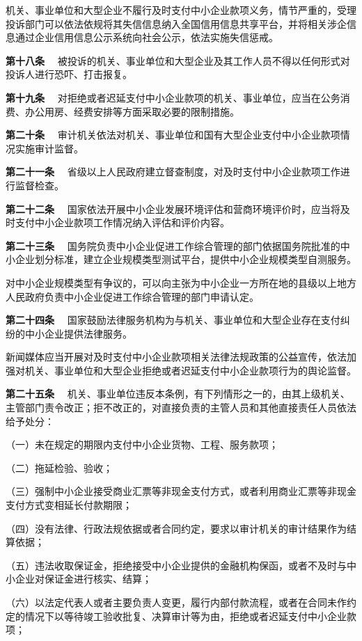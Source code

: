 机关、事业单位和大型企业不履行及时支付中小企业款项义务，情节严重的，受理投诉部门可以依法依规将其失信信息纳入全国信用信息共享平台，并将相关涉企信息通过企业信用信息公示系统向社会公示，依法实施失信惩戒。

{ \bf 第十八条 }　被投诉的机关、事业单位和大型企业及其工作人员不得以任何形式对投诉人进行恐吓、打击报复。

{ \bf 第十九条 }　对拒绝或者迟延支付中小企业款项的机关、事业单位，应当在公务消费、办公用房、经费安排等方面采取必要的限制措施。

{ \bf 第二十条 }　审计机关依法对机关、事业单位和国有大型企业支付中小企业款项情况实施审计监督。

{ \bf 第二十一条 }　省级以上人民政府建立督查制度，对及时支付中小企业款项工作进行监督检查。

{ \bf 第二十二条 }　国家依法开展中小企业发展环境评估和营商环境评价时，应当将及时支付中小企业款项工作情况纳入评估和评价内容。

{ \bf 第二十三条 }　国务院负责中小企业促进工作综合管理的部门依据国务院批准的中小企业划分标准，建立企业规模类型测试平台，提供中小企业规模类型自测服务。

对中小企业规模类型有争议的，可以向主张为中小企业一方所在地的县级以上地方人民政府负责中小企业促进工作综合管理的部门申请认定。

{ \bf 第二十四条 }　国家鼓励法律服务机构为与机关、事业单位和大型企业存在支付纠纷的中小企业提供法律服务。

新闻媒体应当开展对及时支付中小企业款项相关法律法规政策的公益宣传，依法加强对机关、事业单位和大型企业拒绝或者迟延支付中小企业款项行为的舆论监督。

{ \bf 第二十五条 }　机关、事业单位违反本条例，有下列情形之一的，由其上级机关、主管部门责令改正；拒不改正的，对直接负责的主管人员和其他直接责任人员依法给予处分：

（一）未在规定的期限内支付中小企业货物、工程、服务款项；

（二）拖延检验、验收；

（三）强制中小企业接受商业汇票等非现金支付方式，或者利用商业汇票等非现金支付方式变相延长付款期限；

（四）没有法律、行政法规依据或者合同约定，要求以审计机关的审计结果作为结算依据；

（五）违法收取保证金，拒绝接受中小企业提供的金融机构保函，或者不及时与中小企业对保证金进行核实、结算；

（六）以法定代表人或者主要负责人变更，履行内部付款流程，或者在合同未作约定的情况下以等待竣工验收批复、决算审计等为由，拒绝或者迟延支付中小企业款项；

